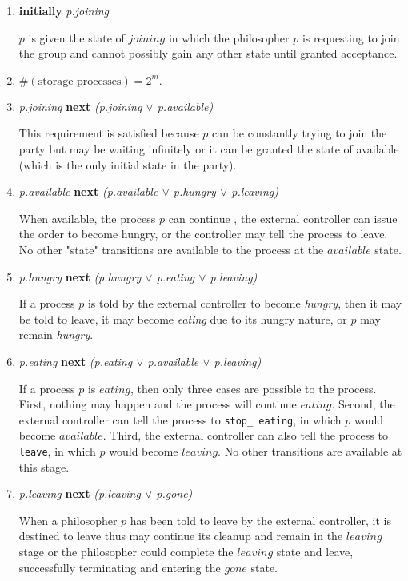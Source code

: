 \documentclass[11pt]{article}
\begin{document}
\begin{enumerate}[S1]
\item {\bfseries initially} {\it p.joining}

$p$ is given the state of $joining$ in which the philosopher $p$ is requesting to join the group and cannot possibly gain any other state until granted acceptance.


\item $\#(\text{storage processes}) = 2^m.$

\item {\it p.joining} {\bfseries next} {\it (p.joining $\vee$ p.available)}

This requirement is satisfied because $p$ can be constantly trying to join the party but may be waiting infinitely or it can be granted the state of available (which is the only initial state in the party).

\item {\it p.available} {\bfseries next} {\it (p.available $\vee$ p.hungry $\vee$ p.leaving)}

When available, the process $p$ can continue \available, the external controller can issue the order to become hungry, or the controller may tell the process to leave. No other "state" transitions are available to the process at the $available$ state. 

\item {\it p.hungry} {\bfseries next} {\it (p.hungry $\vee$ p.eating $\vee$ p.leaving)}

If a process $p$ is told by the external controller to become \emph{hungry}, then it may be told to leave, it may become \emph{eating} due to its hungry nature, or $p$ may remain \emph{hungry}. 

\item {\it p.eating} {\bfseries next} {\it (p.eating $\vee$ p.available $\vee$ p.leaving)}

If a process $p$ is $eating$, then only three cases are possible to the process. First, nothing may happen and the process will continue $eating$. Second, the external controller can tell the process to \texttt{stop\_ eating}, in which $p$ would become $available$. Third, the external controller can also tell the process to \texttt{leave}, in which $p$ would become $leaving$. No other transitions are available at this stage.

\item {\it p.leaving} {\bfseries next} {\it (p.leaving $\vee$ p.gone)}

When a philosopher $p$ has been told to leave by the external controller, it is destined to leave thus may continue its cleanup and remain in the $leaving$ stage or the philosopher could complete the $leaving$ state and leave, successfully terminating and entering the $gone$ state.


\end{enumerate}
\end{document}
